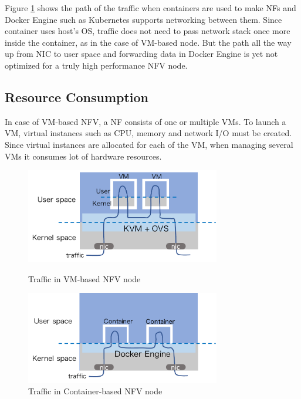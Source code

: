 Figure \ref{fig: docker} shows the path of the traffic when containers are used to make NFs and Docker Engine such as Kubernetes supports networking between them. Since container uses host's OS, traffic does not need to pass network stack once more inside the container, as in the case of VM-based node. But the path all the way up from NIC to user space and forwarding data in Docker Engine is yet not optimized for a truly high performance NFV node. 

\subsection{Resource Consumption}
In case of VM-based NFV, a NF consists of one or multiple VMs. To launch a VM, virtual instances such as CPU, memory and network I/O must be created. Since virtual instances are allocated for each of the VM, when managing several VMs it consumes lot of hardware resources. 

\begin{figure}[t]
	\begin{minipage}{0.5\hsize}
		\begin{center}
			\includegraphics[width=85mm]{pics/KVM+OVS.pdf}
		\end{center}
		\caption{Traffic in VM-based NFV node}
		\label{fig: kvm+ovs}
	\end{minipage}	
	\begin{minipage}{0.5\hsize}
		\begin{center}
			\includegraphics[width=85mm]{pics/Docker.pdf}
		\end{center}
		\caption{Traffic in Container-based NFV node}
		\label{fig: docker}
	\end{minipage}	
\end{figure}

